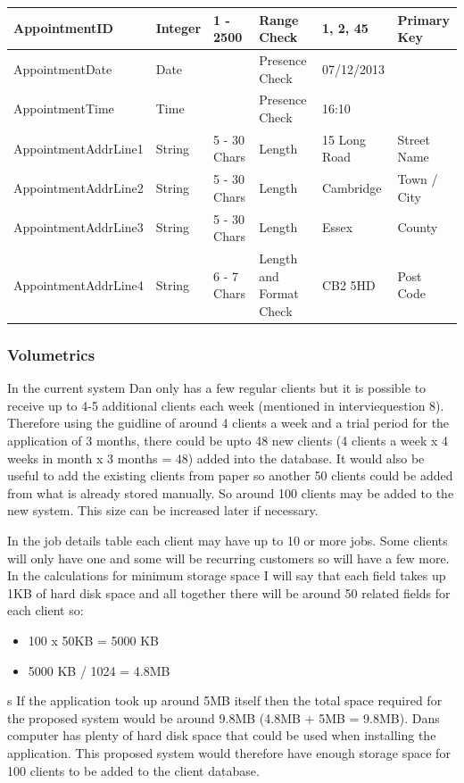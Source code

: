 \begin{flushleft}
\begin{longtable}{|p{4cm}|p{2cm}|p{2cm}|p{2cm}|p{2cm}|p{2cm}|}
AppointmentID & Integer & 1 - 2500 & Range Check & 1, 2, 45 & Primary Key \\ \hline
AppointmentDate & Date & & Presence Check  & 07/12/2013  & \\ \hline
AppointmentTime & Time &  & Presence Check  & 16:10 & \\ \hline
AppointmentAddrLine1 & String & 5 - 30 Chars & Length & 15 Long Road & Street Name \\ \hline
AppointmentAddrLine2 & String & 5 - 30 Chars & Length & Cambridge & Town / City \\ \hline
AppointmentAddrLine3 & String & 5 - 30 Chars & Length & Essex & County \\ \hline
AppointmentAddrLine4 & String & 6 - 7 Chars & Length and Format Check & CB2 5HD & Post Code \\ \hline

\end{longtable}
\end{flushleft}


\subsubsection{Volumetrics}

\begin{flushleft}

	In the current system Dan only has a few regular clients but it is possible to receive up to 4-5 additional clients each week (mentioned in interviequestion 8). Therefore using the guidline of around 4 clients a week and a trial period for the application of 3 months, there could be upto 48 new clients (4 clients a week x 4 weeks in month x 3 months = 48) added into the database. It would also be useful to add the existing clients from paper so another 50 clients could be added from what is already stored manually. So around 100 clients may be added to the new system. This size can be increased later if necessary. \par

In the job details table each client may have up to 10 or more jobs. Some clients will only have one and some will be recurring customers so will have a few more. In the calculations for minimum storage space I will say that each field takes up 1KB of hard disk space and all together there will be around 50 related fields for each client so:

\begin{itemize}
    \item 100 x 50KB = 5000 KB
	 \item 5000 KB / 1024 = 4.8MB
\end{itemize}
s
If the application took up around 5MB itself then the total space required for the proposed system would be around 9.8MB (4.8MB + 5MB = 9.8MB). Dans computer has plenty of hard disk space that could be used when installing the application. This proposed system would therefore have enough storage space for 100 clients to be added to the client database.


\end{flushleft}



